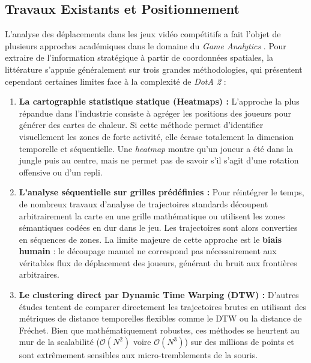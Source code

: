 \documentclass[11pt, a4paper]{article}
\begin{document}
\subsection{Travaux Existants et Positionnement}

L'analyse des déplacements dans les jeux vidéo compétitifs a fait l'objet de plusieurs approches académiques dans le domaine du \textit{Game Analytics} \cite{drachen}. Pour extraire de l'information stratégique à partir de coordonnées spatiales, la littérature s'appuie généralement sur trois grandes méthodologies, qui présentent cependant certaines limites face à la complexité de \textit{DotA 2} :

\begin{enumerate}
    \item \textbf{La cartographie statistique statique (Heatmaps) :}
    L'approche la plus répandue dans l'industrie consiste à agréger les positions des joueurs pour générer des cartes de chaleur. Si cette méthode permet d'identifier visuellement les zones de forte activité, elle écrase totalement la dimension temporelle et séquentielle. Une \textit{heatmap} montre qu'un joueur a été dans la jungle puis au centre, mais ne permet pas de savoir s'il s'agit d'une rotation offensive ou d'un repli.

    \item \textbf{L'analyse séquentielle sur grilles prédéfinies :}
    Pour réintégrer le temps, de nombreux travaux d'analyse de trajectoires standards \cite{zheng} découpent arbitrairement la carte en une grille mathématique ou utilisent les zones sémantiques codées en dur dans le jeu. Les trajectoires sont alors converties en séquences de zones. La limite majeure de cette approche est le \textbf{biais humain} : le découpage manuel ne correspond pas nécessairement aux véritables flux de déplacement des joueurs, générant du bruit aux frontières arbitraires.

    \item \textbf{Le clustering direct par Dynamic Time Warping (DTW) :}
    D'autres études tentent de comparer directement les trajectoires brutes en utilisant des métriques de distance temporelles flexibles comme le DTW ou la distance de Fréchet. Bien que mathématiquement robustes, ces méthodes se heurtent au mur de la scalabilité ($\mathcal{O}(N^2)$ voire $\mathcal{O}(N^3)$) sur des millions de points et sont extrêmement sensibles aux micro-tremblements de la souris.
\end{enumerate}
\end{document}
